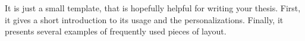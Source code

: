 \documentclass[\myrootdir/main.tex]{subfiles}
\begin{document}
\chapter*{\myAbstractTitle}

It is just a small template, that is hopefully helpful for writing your thesis.
First, it gives a short introduction to its usage and the personalizations.
Finally, it presents several examples of frequently used pieces of layout.

 \\
 \\
 \\
 \\
 \\
 \\
 \\
\end{document}
